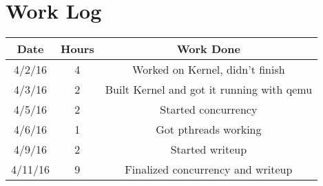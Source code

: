 \documentclass[letterpaper,10pt,titlepage,draftclsnofoot,onecolumn]{IEEEtran}
\begin{document}
\section{Work Log}
\begin{center}
 \begin{tabular}{||c c c ||} 
 \hline
 Date & Hours & Work Done\\ [0.5ex] 
 \hline\hline
 4/2/16 & 4 & Worked on Kernel, didn't finish\\ 
 \hline
 4/3/16 & 2 & Built Kernel and got it running with qemu\\
 \hline
 4/5/16 & 2 & Started concurrency\\
 \hline
 4/6/16 & 1 & Got pthreads working\\
 \hline
 4/9/16 & 2 & Started writeup \\ 
 \hline
 4/11/16 & 9 & Finalized concurrency and writeup\\
 [1ex] 
 \hline
\end{tabular}
\end{center}



\end{document}
